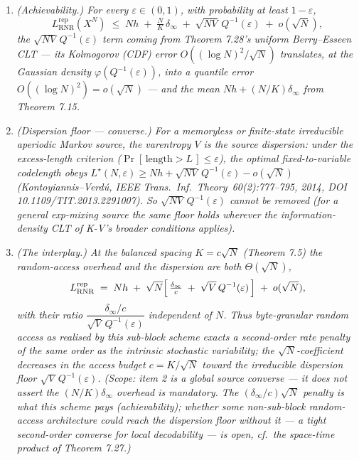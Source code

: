 \documentclass[
]{article}
\begin{document}
\begin{enumerate}
\item \emph{(Achievability.) For every $\varepsilon\in(0,1)$, with probability at
least $1-\varepsilon$,}
\[
L^{\mathrm{rep}}_{\mathrm{RNR}}(X^N)\;\le\;
N h \;+\; \tfrac{N}{K}\,\delta_\infty \;+\; \sqrt{N V}\,Q^{-1}(\varepsilon)
\;+\; o(\sqrt N),
\]
\emph{the $\sqrt{NV}\,Q^{-1}(\varepsilon)$ term coming from Theorem 7.28's
uniform Berry--Esseen CLT --- its Kolmogorov (CDF) error $O((\log N)^2/\sqrt N)$
translates, at the Gaussian density $\varphi(Q^{-1}(\varepsilon))$, into a
\emph{quantile} error $O((\log N)^2)=o(\sqrt N)$ --- and the mean
$Nh+(N/K)\delta_\infty$ from Theorem 7.15.}
\item \emph{(Dispersion floor --- converse.) For a memoryless or finite-state
irreducible aperiodic Markov source, the varentropy $V$ is the source dispersion:
under the excess-length criterion ($\Pr[\,\mathrm{length}>L\,]\le\varepsilon$),
the optimal fixed-to-variable codelength obeys $L^\star(N,\varepsilon)\ge
Nh+\sqrt{NV}\,Q^{-1}(\varepsilon)-o(\sqrt N)$ (Kontoyiannis--Verd\'u, \emph{IEEE
Trans.\ Inf.\ Theory}\ 60(2):777--795, 2014, DOI
10.1109/TIT.2013.2291007). So $\sqrt{NV}\,Q^{-1}(\varepsilon)$ cannot be removed
(for a general exp-mixing source the same floor holds wherever the
information-density CLT of K-V's broader conditions applies).}
\item \emph{(The interplay.) At the balanced spacing $K=c\sqrt N$ (Theorem 7.5)
the random-access overhead and the dispersion are \emph{both} $\Theta(\sqrt N)$,}
\[
L^{\mathrm{rep}}_{\mathrm{RNR}}
\;=\; N h \;+\; \sqrt N\Bigl[\,\tfrac{\delta_\infty}{c}
\;+\; \sqrt V\,Q^{-1}(\varepsilon)\,\Bigr]\;+\;o(\sqrt N),
\]
\emph{with their ratio $\dfrac{\delta_\infty/c}{\sqrt V\,Q^{-1}(\varepsilon)}$
\emph{independent of $N$}. Thus byte-granular random access \emph{as realised by
this sub-block scheme} exacts a second-order rate penalty of the \emph{same
order} as the intrinsic stochastic variability; the $\sqrt N$-coefficient
decreases in the access budget $c=K/\sqrt N$ toward the irreducible dispersion
floor $\sqrt V\,Q^{-1}(\varepsilon)$. \emph{(Scope: item 2 is a global source
converse --- it does not assert the $(N/K)\delta_\infty$ overhead is mandatory.
The $(\delta_\infty/c)\sqrt N$ penalty is what \emph{this} scheme pays
(achievability); whether some non-sub-block random-access architecture could
reach the dispersion floor without it --- a tight second-order converse for
local decodability --- is open, cf.\ the space-time product of Theorem 7.27.)}}
\end{enumerate}
\end{document}

